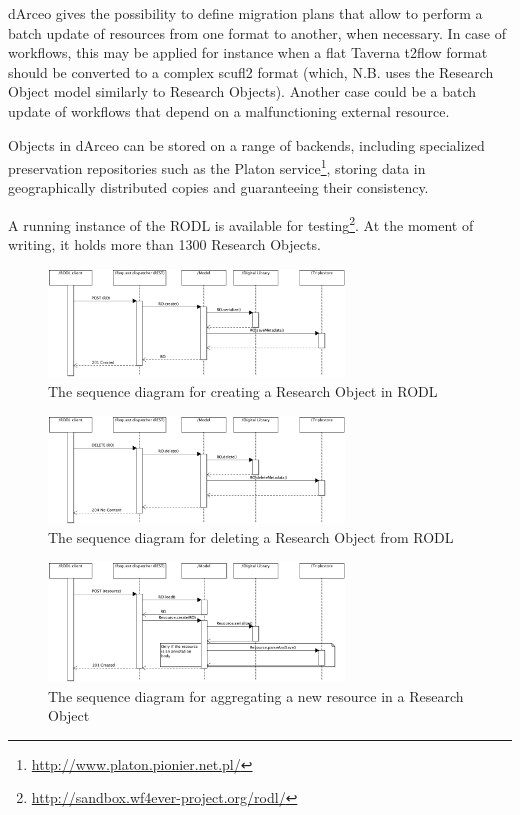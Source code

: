 dArceo gives the possibility to define migration plans that allow to perform a batch update of resources from one format to another, when necessary. In case of workflows, this may be applied for instance when a flat Taverna t2flow format should be converted to a complex scufl2 format (which, N.B. uses the Research Object model similarly to Research Objects). Another case could be a batch update of workflows that depend on a malfunctioning external resource.

Objects in dArceo can be stored on a range of backends, including specialized preservation repositories such as the Platon service\footnote{\url{http://www.platon.pionier.net.pl/}}, storing data in geographically distributed copies and guaranteeing their consistency.

A running instance of the RODL is available for testing\footnote{\url{http://sandbox.wf4ever-project.org/rodl/}}. At the moment of writing, it holds more than 1300 Research Objects.


\begin{figure}[!h]
\centering
\includegraphics[width=0.7\textwidth]{Figures/RODL/ROcreate.png}
\caption{The sequence diagram for creating a Research Object in RODL}
\label{ROCreate}
\end{figure}

\begin{figure}[!h]
\centering
\includegraphics[width=0.7\textwidth]{Figures/RODL/ROdelete.png}
\caption{The sequence diagram for deleting a Research Object from RODL}
\label{RODelete}
\end{figure}

\begin{figure}[!h]
\centering
\includegraphics[width=0.7\textwidth]{Figures/RODL/ResourceAdd.png}
\caption{The sequence diagram for aggregating a new resource in a Research Object}
\label{ResourceAdd}
\end{figure}

